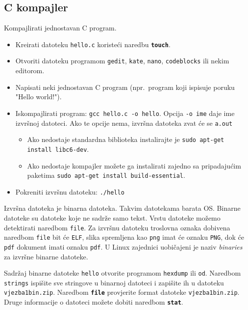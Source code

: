 \subsection*{C kompajler}
\begin{zadatak}
Kompajlirati jednostavan C program. 
\begin{itemize}
 \item Kreirati datoteku \texttt{hello.c} koristeći naredbu \textbf{\texttt{touch}}.
 \item Otvoriti datoteku programom \texttt{gedit}, \texttt{kate}, \texttt{nano}, \texttt{codeblocks} ili nekim editorom.
 \item Napisati neki jednostavan C program (npr.~program koji ispisuje poruku "Hello world!").
\item Iskompajlirati program: \texttt{gcc hello.c -o hello}. Opcija \lstinline!-o ime! daje ime izvršnoj datoteci. Ako te opcije nema, izvršna datoteka zvat će se \lstinline!a.out! 
\begin{itemize}
\item Ako nedostaje standardna biblioteka instalirajte je \texttt{sudo apt-get install libc6-dev}.
\item Ako nedostaje kompajler možete ga instalirati zajedno  sa pripadajućim paketima \texttt{sudo apt-get install build-essential}.                                                                                                                                                                                                                                                                                    \end{itemize}
\item Pokreniti izvršnu datoteku: \texttt{./hello}
\end{itemize}
\end{zadatak}

Izvršna datoteka je binarna datoteka. Takvim datotekama barata OS. Binarne datoteke su datoteke koje ne sadrže samo tekst. Vrstu datoteke možemo detektirati naredbom \lstinline!file!. Za izvršnu datoteku troslovna oznaka dobivena naredbom \lstinline!file! bit će \lstinline!ELF!, slika spremljena kao \lstinline!png! imat će oznaku \lstinline!PNG!, dok će \lstinline!pdf! dokument imati oznaku \lstinline!pdf!. U Linux zajednici uobičajeni je naziv \textit{binaries} za izvršne binarne datoteke. 
\begin{zadatak}
Sadržaj binarne datoteke \texttt{hello} otvorite programom \texttt{hexdump} ili \texttt{od}.
Naredbom \texttt{strings} ispišite sve stringove u binarnoj datoteci i zapišite ih u datoteku \texttt{vjezba1bin.zip}.
Naredbom \textbf{\texttt{file}} provjerite format datoteke \texttt{vjezba1bin.zip}. Druge informacije o datoteci možete dobiti naredbom \textbf{\texttt{stat}}.
\end{zadatak}

